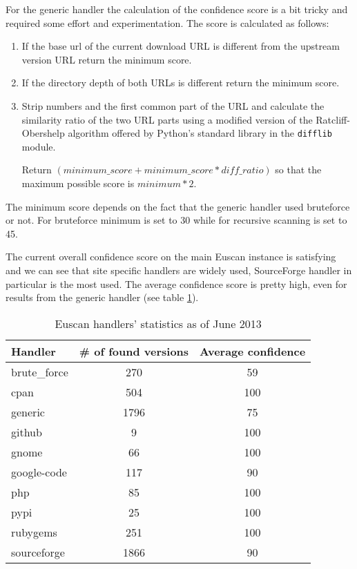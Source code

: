 For the generic handler the calculation of the confidence score is a bit tricky and required some effort and experimentation. The score is calculated as follows:

\begin{enumerate}
\item If the base url of the current download URL is different from the upstream version URL return the minimum score.

\item If the directory depth of both URLs is different return the minimum score.

\item Strip numbers and the first common part of the URL and calculate the similarity ratio of the two URL parts using a modified version of the Ratcliff-Obershelp algorithm offered by Python's standard library in the \texttt{difflib} module.

Return
$(minimum\_score + minimum\_score * diff\_ratio)$
so that the maximum possible score is $minimum * 2$.
\end{enumerate}

The minimum score depends on the fact that the generic handler used bruteforce or not. For bruteforce minimum is set to 30 while for recursive scanning is set to 45.

The current overall confidence score on the main Euscan instance is satisfying and we can see that site specific handlers are widely used, SourceForge handler in particular is the most used. The average confidence score is pretty high, even for results from the generic handler (see table \ref{table:handlers_stats}).

\bgroup
\def\arraystretch{1.2}
\begin{table}[ht]
\caption{Euscan handlers' statistics as of June 2013}
\label{table:handlers_stats}
\centering
\begin{tabular}{l c c}
\\
\hline\hline
Handler & \# of found versions & Average confidence \\
\hline 
brute\_force & 270 & 59 \\
cpan & 504 & 100 \\
generic & 1796 & 75 \\
github & 9 & 100 \\
gnome & 66 & 100 \\
google-code & 117 & 90 \\
php & 85 & 100 \\
pypi & 25 & 100 \\
rubygems & 251 & 100 \\
sourceforge & 1866 & 90 \\
\hline
\end{tabular}
\end{table}
\egroup

